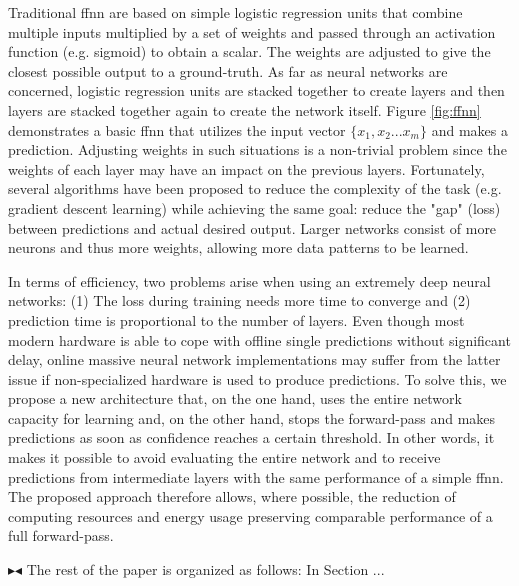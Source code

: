 \documentclass[conference]{IEEEtran}
\newcommand{\mynote}[3]{
    \fbox{\bfseries\sffamily\scriptsize#1}
    {\small$\blacktriangleright$\textsf{\emph{\color{#3}{#2}}}$\blacktriangleleft$}}
\newcommand{\todo}[1]{\mynote{TODO}{#1}{red}}
\begin{document}
Traditional \gls{ffnn} are based on simple logistic regression units that combine multiple inputs multiplied by a set of weights and passed through an activation function (e.g. sigmoid) to obtain a scalar. The weights are adjusted to give the closest possible output to a ground-truth. As far as neural networks are concerned, logistic regression units are stacked together to create layers and then layers are stacked together again to create the network itself. Figure \ref{fig:ffnn} demonstrates a basic \gls{ffnn} that utilizes the input vector $\lbrace x_{1}, x_{2} ... x_{m} \rbrace$ and makes a prediction. Adjusting weights in such situations is a non-trivial problem since the weights of each layer may have an impact on the previous layers. Fortunately, several algorithms have been proposed to reduce the complexity of the task (e.g. gradient descent learning) while achieving the same goal: reduce the "gap" (loss) between predictions and actual desired output. Larger networks consist of more neurons and thus more weights, allowing more data patterns to be learned.

In terms of efficiency, two problems arise when using an extremely deep neural networks: (1) The loss during training needs more time to converge and (2) prediction time is proportional to the number of layers. Even though most modern hardware is able to cope with offline single predictions without significant delay, online massive neural network implementations may suffer from the latter issue if non-specialized hardware is used to produce predictions.
To solve this, we propose a new architecture that, on the one hand, uses the entire network capacity for learning and, on the other hand, stops the forward-pass and makes predictions as soon as confidence reaches a certain threshold. In other words, it makes it possible to avoid evaluating the entire network and to receive predictions from intermediate layers with the same performance of a simple \gls{ffnn}. The proposed approach therefore allows, where possible, the reduction of computing resources and energy usage preserving comparable performance of a full forward-pass.


\todo{Max: For such a short paper it might not be necessary to give an overview?}
The rest of the paper is organized as follows: In Section ...
\end{document}
